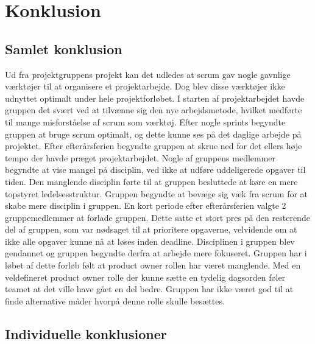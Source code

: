 \chapter*{Konklusion}
\section*{Samlet konklusion}
Ud fra projektgruppens projekt kan det udledes at scrum gav nogle gavnlige værktøjer til at organisere et projektarbejde. Dog blev disse værktøjer ikke udnyttet optimalt under hele projektforløbet. I starten af projektarbejdet havde gruppen det svært ved at tilvænne sig den nye arbejdsmetode, hvilket medførte til mange misforståelse af scrum som værktøj. Efter nogle sprints begyndte gruppen at bruge scrum optimalt, og dette kunne ses på det daglige arbejde på projektet. Efter efterårsferien begyndte gruppen at skrue ned for det ellers høje tempo der havde præget projektarbejdet. Nogle af gruppens medlemmer begyndte at vise mangel på disciplin, ved ikke at udføre uddeligerede opgaver til tiden. Den manglende disciplin førte til at gruppen besluttede at køre en mere topstyret ledelsesstruktur. Gruppen begyndte at bevæge sig væk fra scrum for at skabe mere disciplin i gruppen. En kort periode efter efterårsferien valgte 2 gruppemedlemmer at forlade gruppen. Dette satte et stort pres på den resterende del af gruppen, som var nødsaget til at prioritere opgaverne, velvidende om at ikke alle opgaver kunne nå at løses inden deadline. Disciplinen i gruppen blev gendannet og gruppen begyndte derfra at arbejde mere fokuseret. Gruppen har i løbet af dette forløb følt at product owner rollen har været manglende. Med en veldefineret product owner rolle der kunne sætte en tydelig dagsorden føler teamet at det ville have gået en del bedre. Gruppen har ikke været god til at finde alternative måder hvorpå denne rolle skulle besættes. 

\section*{Individuelle konklusioner}